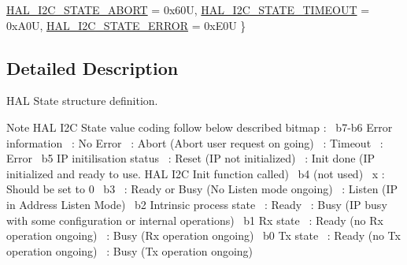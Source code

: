 \begin{DoxyCompactItemize}
\newline
\hyperlink{group___h_a_l__state__structure__definition_ggaef355af8eab251ae2a19ee164ad81c37a2c6f6d1fef0847f9da51153b5c295249}{H\+A\+L\+\_\+\+I2\+C\+\_\+\+S\+T\+A\+T\+E\+\_\+\+A\+B\+O\+RT} = 0x60U, 
\hyperlink{group___h_a_l__state__structure__definition_ggaef355af8eab251ae2a19ee164ad81c37a378abf24301fe7a23620fd78ff3f168b}{H\+A\+L\+\_\+\+I2\+C\+\_\+\+S\+T\+A\+T\+E\+\_\+\+T\+I\+M\+E\+O\+UT} = 0x\+A0U, 
\hyperlink{group___h_a_l__state__structure__definition_ggaef355af8eab251ae2a19ee164ad81c37afe3c9b304462901099426a0d414be2a2}{H\+A\+L\+\_\+\+I2\+C\+\_\+\+S\+T\+A\+T\+E\+\_\+\+E\+R\+R\+OR} = 0x\+E0U
 \}
\end{DoxyCompactItemize}


\subsection{Detailed Description}
H\+AL State structure definition. 

\begin{DoxyNote}{Note}
H\+AL I2C State value coding follow below described bitmap \+:~\newline
 b7-\/b6 Error information~ \+: No Error~ \+: Abort (Abort user request on going)~ \+: Timeout~ \+: Error~\newline
 b5 IP initilisation status~ \+: Reset (IP not initialized)~ \+: Init done (IP initialized and ready to use. H\+AL I2C Init function called)~\newline
 b4 (not used)~\newline
 x \+: Should be set to 0~\newline
 b3~ \+: Ready or Busy (No Listen mode ongoing)~ \+: Listen (IP in Address Listen Mode)~\newline
 b2 Intrinsic process state~ \+: Ready~ \+: Busy (IP busy with some configuration or internal operations)~\newline
 b1 Rx state~ \+: Ready (no Rx operation ongoing)~ \+: Busy (Rx operation ongoing)~\newline
 b0 Tx state~ \+: Ready (no Tx operation ongoing)~ \+: Busy (Tx operation ongoing) 
\end{DoxyNote}


